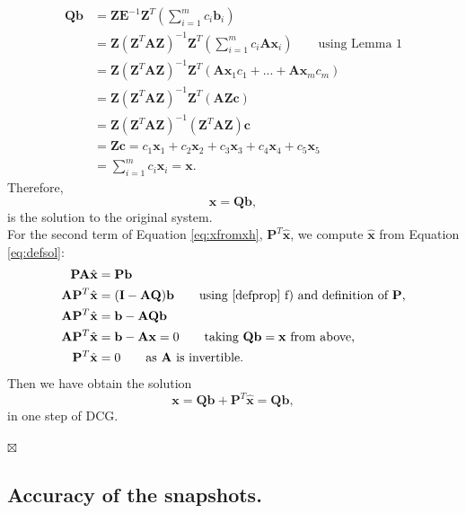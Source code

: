 \documentclass[12pt]{article}
\begin{document}
\begin{align*}
\mathbf{Q}\mathbf{b}&=\mathbf{Z}\mathbf{E}^{-1}\mathbf{Z}^T\left(\sum_{i=1}^m {c}_i\mathbf{b}_i\right)\\
&=\mathbf{Z}(\mathbf{Z}^T\mathbf{A}\mathbf{Z})^{-1}\mathbf{Z}^T\left(\sum_{i=1}^m {c}_i\mathbf{A}\mathbf{x}_i\right)\qquad \text{using Lemma 1}\\
&=\mathbf{Z}(\mathbf{Z}^T\mathbf{A}\mathbf{Z})^{-1}\mathbf{Z}^T\left( \mathbf{A}\mathbf{x}_1{c}_1+...+\mathbf{A}\mathbf{x}_m{c}_m\right) \\
&=\mathbf{Z}(\mathbf{Z}^T\mathbf{A}\mathbf{Z})^{-1}\mathbf{Z}^T(\mathbf{A}\mathbf{Z}\mathbf{c})  \\
&=\mathbf{Z}(\mathbf{Z}^T\mathbf{A}\mathbf{Z})^{-1}(\mathbf{Z}^T\mathbf{A}\mathbf{Z})\mathbf{c} \\
&=\mathbf{Z}\mathbf{c}= c_1\mathbf{x}_1+c_2\mathbf{x}_2+c_3\mathbf{x}_3+c_4\mathbf{x}_4+c_5\mathbf{x}_5\\
& =\sum_{i=1}^m {c}_i\mathbf{x}_i=\mathbf{x}.
\end{align*}
Therefore,
\begin{equation}\label{eq:xqb}
\mathbf{x}=\mathbf{Q}\mathbf{b},
\end{equation}
is the solution to the original system.\\ 
For the second term of Equation \eqref{eq:xfromxh}, $\mathbf{P}^T\mathbf{\hat{x}}$, we compute $\mathbf{\hat{x}}$ from Equation \eqref{eq:defsol}:
\begin{align*}
    \mathbf{P}\mathbf{A}\hat{\mathbf{x}}&=\mathbf{P}\mathbf{b}\\
    \mathbf{A}\mathbf{P}^T\hat{\mathbf{x}}&=(\mathbf{I}-\mathbf{A}\mathbf{Q})\mathbf{b} \qquad \text{using \ref{defprop} f) and definition of $\mathbf{P}$,}\\
        \mathbf{A}\mathbf{P}^T\hat{\mathbf{x}}&=\mathbf{b}-\mathbf{A}\mathbf{Q}\mathbf{b}\\
        \mathbf{A}\mathbf{P}^T\hat{\mathbf{x}}&=\mathbf{b}-\mathbf{A}\mathbf{x}=0 \qquad \text{taking $\mathbf{Q}\mathbf{b}=\mathbf{x}$ from above,}\\
          \mathbf{P}^T\hat{\mathbf{x}}&=0 \qquad \text{as $\mathbf{A}$ is invertible.}
\end{align*}
Then we have obtain the solution 
$$\mathbf{x}=\mathbf{Q}\mathbf{b}+\mathbf{P}^T\mathbf{\hat{x}}=\mathbf{Q}\mathbf{b},$$ 
in one step of DCG.
\begin{flushright}
$\boxtimes $                
\end{flushright}
\subsection{Accuracy of the snapshots.}\label{accs}
\end{document}
